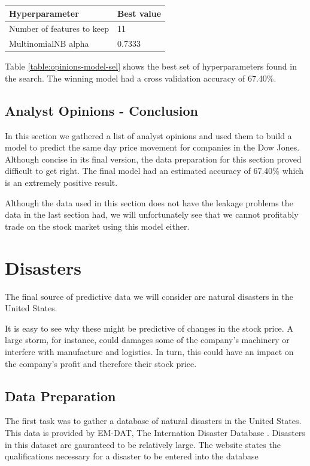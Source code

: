 \documentclass{report}
\begin{document}
\begin{center}
  \begin{tabular}{l | l}
	  \textbf{Hyperparameter} & \textbf{Best value} \\ \hline
	  Number of features to keep & 11 \\ \hline
	  MultinomialNB alpha & 0.7333
	  \label{table:opinions-model-sel}
  \end{tabular}
\end{center}

Table \ref{table:opinions-model-sel} shows the best set of hyperparameters found in the search. The winning model had a cross validation accuracy of 67.40\%.

\subsection{Analyst Opinions - Conclusion}

In this section we gathered a list of analyst opinions and used them to build a model to predict the same day price movement for companies in the Dow Jones. Although concise in its final version, the data preparation for this section proved difficult to get right. The final model had an estimated accuracy of 67.40\% which is an extremely positive result. 

Although the data used in this section does not have the leakage problems the data in the last section had, we will unfortunately see that we cannot profitably trade on the stock market using this model either. 

\clearpage
\section{Disasters}

The final source of predictive data we will consider are natural disasters in the United States. 

It is easy to see why these might be predictive of changes in the stock price. A large storm, for instance, could damages some of the company's machinery or interfere with manufacture and logistics. In turn, this could have an impact on the company's profit and therefore their stock price.

\subsection{Data Preparation}

The first task was to gather a database of natural disasters in the United States. This data is provided by EM-DAT, The Internation Disaster Database \cite{disasterdb}. Disasters in this dataset are gauranteed to be relatively large. The website states the qualifications necessary for a disaster to be entered into the database
\end{document}
